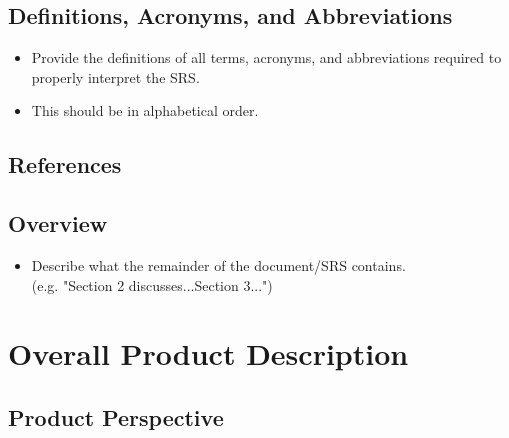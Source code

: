 \documentclass[]{article}
\begin{document}

\subsection{Definitions, Acronyms, and Abbreviations}
\label{sub:definitions_acronyms_and_abbreviations}
\begin{itemize}
	\item Provide the definitions of all terms, acronyms, and abbreviations required to properly interpret the SRS.
	\item This should be in alphabetical order.
\end{itemize}

\subsection{References}
\label{sub:references}

\renewcommand{\refname}{}  %
\vspace{-7mm}  %


\subsection{Overview}
\label{sub:overview}
\begin{itemize}
	\item Describe what the remainder of the document/SRS contains.\\
	(e.g. "Section 2 discusses...Section 3...")
\end{itemize}


\section{Overall Product Description}
\label{sec:overall_description}

\subsection{Product Perspective}
\label{sub:product_perspective}
\end{document}
